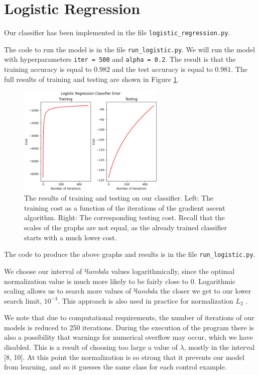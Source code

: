 \documentclass{article}
\newcommand{\code}{\texttt}
\begin{document}
\section{Logistic Regression}

Our classifier has been implemented in the file \code{logistic\_regression.py}.

The code to run the model is in the file \code{run\_logistic.py}. We will run the model with hyperparameters \code{iter = 500} and \code{alpha = 0.2}. The result is that the training accuracy is equal to $0.982$ and the test accuracy is equal to $0.981$. The full results of training and testing are shown in Figure \ref{logistic_train_test}.

\begin{figure}
	\includegraphics[width=7cm]{logistic_error.png}
	\centering
	\caption{The results of training and testing on our classifier. Left: The training cost as a function of the iterations of the gradient ascent algorithm. Right: The corresponding testing cost. Recall that the scales of the graphs are not equal, as the already trained classifier starts with a much lower cost. }
	\label{logistic_train_test}
\end{figure}


The code to produce the above graphs and results is in the file \code{run\_logistic.py}.

We choose our interval of \code{$³lambda$} values logarithmically, since the optimal normalization value is much more likely to be fairly close to 0. Logarithmic scaling allows us to search more values of \code{$³lambda$} the closer we get to our lower search limit, $10^{-4}$. This approach is also used in practice for normalization $L_{2}$ \cite{jerome}.

We note that due to computational requirements, the number of iterations of our models is reduced to 250 iterations. During the execution of the program there is also a possibility that warnings for numerical overflow may occur, which we have disabled. This is a result of choosing too large a value of \code{$\lambda$}, mostly in the interval [8, 10]. At this point the normalization is so strong that it prevents our model from learning, and so it guesses the same class for each control example.
\end{document}
